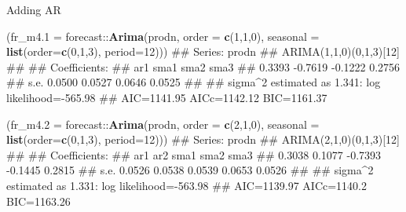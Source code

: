 \documentclass[11pt,ignorenonframetext,]{beamer}
\newenvironment{Shaded}{}{}
\newcommand{\DataTypeTok}[1]{\textcolor[rgb]{0.56,0.13,0.00}{#1}}
\newcommand{\DecValTok}[1]{\textcolor[rgb]{0.25,0.63,0.44}{#1}}
\newcommand{\KeywordTok}[1]{\textcolor[rgb]{0.00,0.44,0.13}{\textbf{#1}}}
\newcommand{\NormalTok}[1]{#1}
\newcommand{\OperatorTok}[1]{\textcolor[rgb]{0.40,0.40,0.40}{#1}}
\let\oldShaded\Shaded
\let\endoldShaded\endShaded
\renewenvironment{Shaded}{\footnotesize\begin{spacing}{0.9}\oldShaded}{\endoldShaded\end{spacing}}
\let\oldverbatim\verbatim
\let\endoldverbatim\endverbatim
\newcommand{\scriptoutput}{
  \renewenvironment{Shaded}{\scriptsize\begin{spacing}{0.9}\oldShaded}{\endoldShaded\end{spacing}}
  \renewenvironment{verbatim}{\scriptsize\begin{spacing}{0.9}\oldverbatim}{\endoldverbatim\end{spacing}}
}
\begin{document}
\begin{frame}[fragile]{%
\protect\hypertarget{adding-ar}{%
Adding AR}}

\scriptoutput

\begin{Shaded}
\begin{Highlighting}[]
\NormalTok{(}\DataTypeTok{fr_m4.1 =}\NormalTok{ forecast}\OperatorTok{::}\KeywordTok{Arima}\NormalTok{(prodn, }\DataTypeTok{order =} \KeywordTok{c}\NormalTok{(}\DecValTok{1}\NormalTok{,}\DecValTok{1}\NormalTok{,}\DecValTok{0}\NormalTok{), }
            \DataTypeTok{seasonal =} \KeywordTok{list}\NormalTok{(}\DataTypeTok{order=}\KeywordTok{c}\NormalTok{(}\DecValTok{0}\NormalTok{,}\DecValTok{1}\NormalTok{,}\DecValTok{3}\NormalTok{), }\DataTypeTok{period=}\DecValTok{12}\NormalTok{)))}
\NormalTok{## Series: prodn }
\NormalTok{## ARIMA(1,1,0)(0,1,3)[12] }
\NormalTok{## }
\NormalTok{## Coefficients:}
\NormalTok{##          ar1     sma1     sma2    sma3}
\NormalTok{##       0.3393  -0.7619  -0.1222  0.2756}
\NormalTok{## s.e.  0.0500   0.0527   0.0646  0.0525}
\NormalTok{## }
\NormalTok{## sigma^2 estimated as 1.341:  log likelihood=-565.98}
\NormalTok{## AIC=1141.95   AICc=1142.12   BIC=1161.37}
\end{Highlighting}
\end{Shaded}

\begin{Shaded}
\begin{Highlighting}[]
\NormalTok{(}\DataTypeTok{fr_m4.2 =}\NormalTok{ forecast}\OperatorTok{::}\KeywordTok{Arima}\NormalTok{(prodn, }\DataTypeTok{order =} \KeywordTok{c}\NormalTok{(}\DecValTok{2}\NormalTok{,}\DecValTok{1}\NormalTok{,}\DecValTok{0}\NormalTok{), }
            \DataTypeTok{seasonal =} \KeywordTok{list}\NormalTok{(}\DataTypeTok{order=}\KeywordTok{c}\NormalTok{(}\DecValTok{0}\NormalTok{,}\DecValTok{1}\NormalTok{,}\DecValTok{3}\NormalTok{), }\DataTypeTok{period=}\DecValTok{12}\NormalTok{)))}
\NormalTok{## Series: prodn }
\NormalTok{## ARIMA(2,1,0)(0,1,3)[12] }
\NormalTok{## }
\NormalTok{## Coefficients:}
\NormalTok{##          ar1     ar2     sma1     sma2    sma3}
\NormalTok{##       0.3038  0.1077  -0.7393  -0.1445  0.2815}
\NormalTok{## s.e.  0.0526  0.0538   0.0539   0.0653  0.0526}
\NormalTok{## }
\NormalTok{## sigma^2 estimated as 1.331:  log likelihood=-563.98}
\NormalTok{## AIC=1139.97   AICc=1140.2   BIC=1163.26}
\end{Highlighting}
\end{Shaded}

\end{frame}
\end{document}
